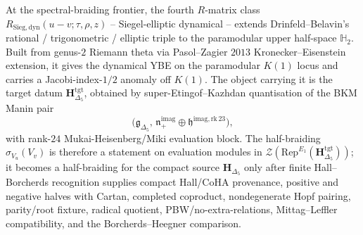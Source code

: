 \begin{remark}
\label{rem:sbf-R-sieg-frontier}
At the spectral-braiding frontier, the fourth $R$-matrix class
$R_{\mathrm{Sieg,dyn}}(u - v; \tau, \rho, z)$ -- Siegel-elliptic
dynamical -- extends Drinfeld--Belavin's rational / trigonometric /
elliptic triple to the paramodular upper half-space $\mathbb{H}_2$.
Built from genus-$2$ Riemann theta via Pasol--Zagier $2013$
Kronecker--Eisenstein extension, it gives the dynamical YBE on the
paramodular $K(1)$ locus and carries a Jacobi-index-$1/2$ anomaly off
$K(1)$. The object carrying it is the target datum
$\mathbf H_{\Delta_5}^{\mathrm{tgt}}$, obtained by
super-Etingof--Kazhdan quantisation of the BKM Manin pair
\[
\bigl(\mathfrak g_{\Delta_5},\,
\mathfrak n_+^{\mathrm{imag}}\oplus
\mathfrak h^{\mathrm{imag,rk\,23}}\bigr),
\]
with rank-$24$ Mukai-Heisenberg/Miki evaluation block. The half-braiding
$\sigma_{V_u}(V_v)$ is therefore a statement on evaluation modules in
$\mathcal{Z}(\mathrm{Rep}^{E_1}(\mathbf H_{\Delta_5}^{\mathrm{tgt}}))$;
it becomes a half-braiding for the compact source
$\mathbf H_{\Delta_5}$ only after finite Hall--Borcherds recognition
supplies compact Hall/CoHA provenance, positive and negative halves with
Cartan, completed coproduct, nondegenerate Hopf pairing, parity/root
fixture, radical quotient, PBW/no-extra-relations, Mittag--Leffler
compatibility, and the Borcherds--Heegner comparison.
\end{remark}

